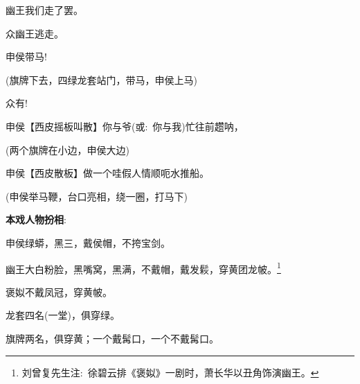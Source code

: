 {\textrm{幽王\hspace{30pt}我们走了罢。}

\textrm{众\hspace{41pt}幽王逃走。}

\textrm{申侯\hspace{30pt}带马!}

\textrm{(旗牌{\hwfs 下去}，{\hwfs 四绿}龙套{\hwfs 站门}，{\hwfs 带马}，申侯{\hwfs 上马})}


\textrm{众\hspace{41pt}有!}

\textrm{申侯\hspace{30pt}【{\akai 西皮摇板}{\footnotesize 叫散}】你与爷({\akai 或}:~你与我)忙往前趱{\footnotesize 呐}，}

\textrm{({\hwfs 两个}旗牌{\hwfs 在小边}，申侯{\hwfs 大边})}

\textrm{申侯\hspace{30pt}【{\akai 西皮散板}】做一个{\footnotesize 哇}假人情顺{\footnotesize 呃}水推船。}

\textrm{(申侯{\hwfs 举马鞭}，{\hwfs 台口亮相}，{\hwfs 绕一圈}，{\hwfs 打马下})}
}

\vspace{15pt}
{\bfseries\textrm{本戏人物扮相}}:~
\vspace{15pt}

申侯\hspace{30pt}绿蟒，黑三，戴侯帽，不挎宝剑。

幽王\hspace{30pt}大白粉脸，黑嘴窝，黑满，不戴帽，戴发鬏，穿黄团龙帔。\footnote{刘曾复先生注:~徐碧云排《褒姒》一剧时，萧长华以丑角饰演幽王。}%

褒姒\hspace{30pt}不戴凤冠，穿黄帔。

龙套\hspace{30pt}四名(一堂)，俱穿绿。

旗牌\hspace{30pt}两名，俱穿黄；一个戴髯口，一个不戴髯口。

